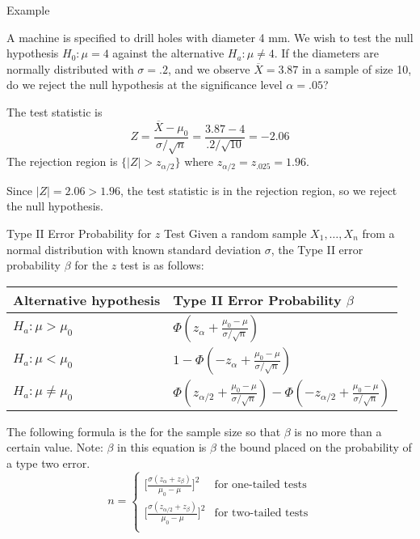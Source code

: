 \documentclass[t,handout]{beamer}
\begin{document}
    \begin{frame}{Example}
    \begin{block}{}
    A machine is specified to drill holes with diameter 4 mm. We wish to test the null hypothesis $H_0: \mu=4$ against the alternative $H_a: \mu\neq 4$. If the diameters are normally distributed with $\sigma=.2$, and we observe $\overline X=3.87$ in a sample of size 10, do we reject the null hypothesis at the significance level $\alpha=.05$?
    \end{block}
    
    \pause
    The test statistic is 
    $$Z=\frac{\overline X-\mu_0}{\sigma/\sqrt{n}}=\frac{3.87-4}{.2/\sqrt{10}}=-2.06$$
    \pause The rejection region is $\{|Z|>z_{\alpha/2}\}$ where $z_{\alpha/2}=z_{.025}=1.96$.
    
    \vspace{.2cm}
    \pause Since $|Z|=2.06>1.96$, the test statistic is in the rejection region, so we reject the null hypothesis.
    \end{frame}
    
    \begin{frame}{Type II Error Probability for $z$ Test}
    Given a random sample $X_1,\dots,X_n$ from a normal distribution with known standard deviation $\sigma$, the Type II error probability $\beta$ for the $z$ test is as follows:
    \begin{center}
    \renewcommand*{\arraystretch}{1.2}
    \begin{tabular}{l|l}
    Alternative hypothesis & Type II Error Probability $\beta$ \\ \hline
    $H_a: \mu>\mu_0$ & $\Phi(z_\alpha+\frac{\mu_0-\mu}{\sigma/\sqrt{n}})$ \\
    $H_a: \mu<\mu_0$ & $1-\Phi(-z_\alpha+\frac{\mu_0-\mu}{\sigma/\sqrt{n}})$ \\
    $H_a: \mu\neq\mu_0$ & $\Phi(z_{\alpha/2}+\frac{\mu_0-\mu}{\sigma/\sqrt{n}})-\Phi(-z_{\alpha/2}+\frac{\mu_0-\mu}{\sigma/\sqrt{n}})$\\
    \end{tabular}
    \end{center}
    The following formula is the for the sample size so that $\beta$ is no more than a certain value. Note: $\beta$ in this equation is $\beta$ the bound placed on the probability of a type two error.
    $$
    n =
    \begin{cases}
        \bigg[\frac{\sigma(z_{\alpha} + z_\beta)}{\mu_0 - \mu}\bigg]^2 & \text{for one-tailed tests}\\
        \bigg[\frac{\sigma(z_{\alpha/2} + z_\beta)}{\mu_0 - \mu}\bigg]^2& \text{for two-tailed tests}\\
    \end{cases}
    $$
    \end{frame}
    
\end{document}
